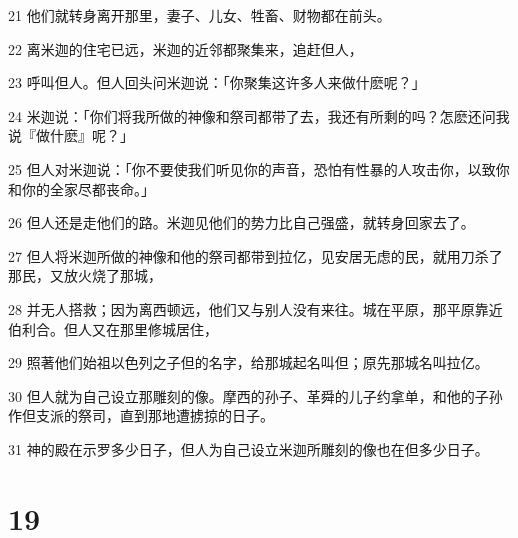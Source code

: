 \par 21 他们就转身离开那里，妻子、儿女、牲畜、财物都在前头。
\par 22 离米迦的住宅已远，米迦的近邻都聚集来，追赶但人，
\par 23 呼叫但人。但人回头问米迦说：「你聚集这许多人来做什麽呢？」
\par 24 米迦说：「你们将我所做的神像和祭司都带了去，我还有所剩的吗？怎麽还问我说『做什麽』呢？」
\par 25 但人对米迦说：「你不要使我们听见你的声音，恐怕有性暴的人攻击你，以致你和你的全家尽都丧命。」
\par 26 但人还是走他们的路。米迦见他们的势力比自己强盛，就转身回家去了。
\par 27 但人将米迦所做的神像和他的祭司都带到拉亿，见安居无虑的民，就用刀杀了那民，又放火烧了那城，
\par 28 并无人搭救；因为离西顿远，他们又与别人没有来往。城在平原，那平原靠近伯利合。但人又在那里修城居住，
\par 29 照著他们始祖以色列之子但的名字，给那城起名叫但；原先那城名叫拉亿。
\par 30 但人就为自己设立那雕刻的像。摩西的孙子、革舜的儿子约拿单，和他的子孙作但支派的祭司，直到那地遭掳掠的日子。
\par 31 神的殿在示罗多少日子，但人为自己设立米迦所雕刻的像也在但多少日子。

\chapter{19}

